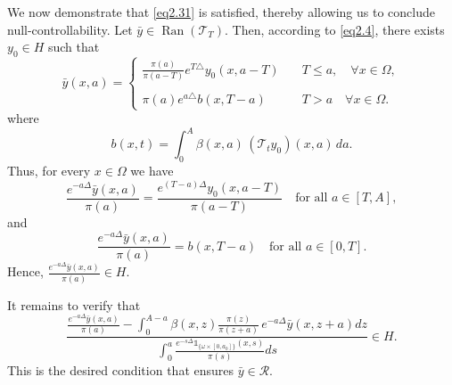 \documentclass[10pt, a4]{amsart}
\makeatletter
\theoremstyle{plain}
\theoremstyle{definition}
\theoremstyle{remark}
\renewenvironment{proof}[1][\proofname]{\par
  \pushQED{\qed}%
  \normalfont \topsep6\p@\@plus6\p@\relax
  \trivlist
  \item[\hskip\labelsep
        \itshape
    #1\ \ref{#1}.]\ignorespaces
}{%
  \popQED\endtrivlist\@endpefalse
}
\numberwithin{equation}{section}
\makeatother
\begin{document}
 \begin{proof}[of Proposition \ref{pr2.5}]
We now demonstrate that \eqref{eq2.31} is satisfied, thereby allowing us to conclude null-controllability. Let \(\bar{y} \in \operatorname{Ran}(\mathcal{T}_T)\). Then, according to \eqref{eq2.4}, there exists \(y_0 \in H\) such that  
 \begin{equation}
\bar{y}(x,a)=\left\lbrace
\begin{array}{ll}
\frac{\pi(a)}{\pi(a-T)}e^{T\triangle}y_0(x,a-T)\quad & T\leq a, \quad\forall x\in\Omega,\\
\\\pi(a)e^{a\triangle}b(x,T-a)\quad & T>a\quad\forall x\in\Omega.
\end{array}
\right.
\end{equation}
where  
\[
b(x,t)=\int_0^A \beta(x,a)\, (\mathcal{T}_t y_0)(x,a)\, da.
\]
Thus, for every \(x\in \Omega\) we have  
\[
\frac{e^{-a\Delta}\bar{y}(x,a)}{\pi(a)} = \frac{e^{(T-a)\Delta}y_0(x,a-T)}{\pi(a-T)} \quad \text{for all } a \in [T,A],
\]
and  
\[
\frac{e^{-a\Delta}\bar{y}(x,a)}{\pi(a)} = b(x,T-a) \quad \text{for all } a \in [0,T].
\]
Hence, \(\frac{e^{-a\Delta}\bar{y}(x,a)}{\pi(a)}\in H\).

It remains to verify that  
\begin{equation}\label{eq2.33}
\frac{\frac{e^{-a\Delta}\bar{y}(x,a)}{\pi(a)} - \displaystyle\int_{0}^{A-a} \beta(x,z) \frac{\pi(z)}{\pi(z+a)}\, e^{-a\Delta}\bar{y}(x,z+a)dz}{\displaystyle\int_{0}^{a}\frac{e^{-s\Delta}\mathds{1}_{\{\omega\times[0,a_0]\}}(x,s)}{\pi(s)} ds} \in H.
\end{equation}
This is the desired condition that ensures \(\bar{y} \in \mathcal{R}\).


\end{proof}
\end{document}
